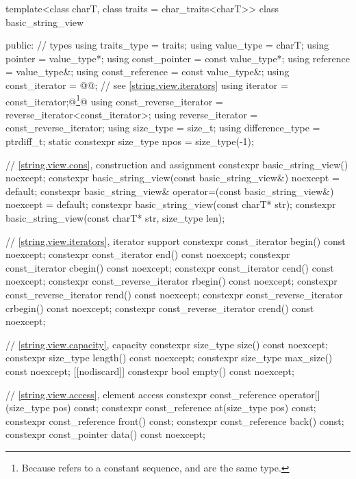 \begin{codeblock}
template<class charT, class traits = char_traits<charT>>
class basic_string_view {
public:
  // types
  using traits_type            = traits;
  using value_type             = charT;
  using pointer                = value_type*;
  using const_pointer          = const value_type*;
  using reference              = value_type&;
  using const_reference        = const value_type&;
  using const_iterator         = @@; // see \ref{string.view.iterators}
  using iterator               = const_iterator;@\footnote{Because  refers to a constant sequence,  and  are the same type.}@
  using const_reverse_iterator = reverse_iterator<const_iterator>;
  using reverse_iterator       = const_reverse_iterator;
  using size_type              = size_t;
  using difference_type        = ptrdiff_t;
  static constexpr size_type npos = size_type(-1);

  // \ref{string.view.cons}, construction and assignment
  constexpr basic_string_view() noexcept;
  constexpr basic_string_view(const basic_string_view&) noexcept = default;
  constexpr basic_string_view& operator=(const basic_string_view&) noexcept = default;
  constexpr basic_string_view(const charT* str);
  constexpr basic_string_view(const charT* str, size_type len);

  // \ref{string.view.iterators}, iterator support
  constexpr const_iterator begin() const noexcept;
  constexpr const_iterator end() const noexcept;
  constexpr const_iterator cbegin() const noexcept;
  constexpr const_iterator cend() const noexcept;
  constexpr const_reverse_iterator rbegin() const noexcept;
  constexpr const_reverse_iterator rend() const noexcept;
  constexpr const_reverse_iterator crbegin() const noexcept;
  constexpr const_reverse_iterator crend() const noexcept;

  // \ref{string.view.capacity}, capacity
  constexpr size_type size() const noexcept;
  constexpr size_type length() const noexcept;
  constexpr size_type max_size() const noexcept;
  [[nodiscard]] constexpr bool empty() const noexcept;

  // \ref{string.view.access}, element access
  constexpr const_reference operator[](size_type pos) const;
  constexpr const_reference at(size_type pos) const;
  constexpr const_reference front() const;
  constexpr const_reference back() const;
  constexpr const_pointer data() const noexcept;

}
\end{codeblock}
